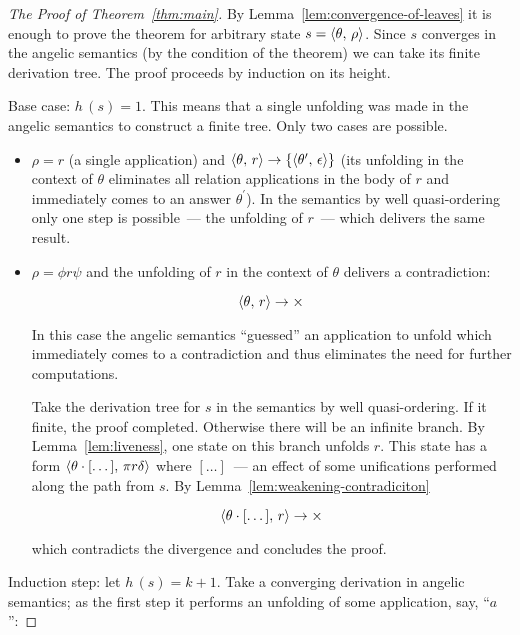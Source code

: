 \begin{proof}[The Proof of Theorem~\ref{thm:main}]
  By Lemma~\ref{lem:convergence-of-leaves} it is enough to prove the theorem for arbitrary state $s=\langle \theta,\,\rho \rangle$. Since $s$
  converges in the angelic semantics (by the condition of the theorem) we can take its finite derivation tree. The proof proceeds by induction
  on its height.

  Base case: $h\,(s)=1$. This means that a single unfolding was made in the angelic semantics to construct a finite tree. Only two cases
  are possible.

  \begin{itemize}
  \item $\rho=r$ (a single application) and $\langle \theta,\,r \rangle\to\{\langle \theta^\prime,\,\epsilon \rangle\}$ (its unfolding in the context of $\theta$
    eliminates all relation applications in the body of $r$ and immediately comes to an answer $\theta^\prime$). In the semantics by well quasi-ordering
    only one step is possible~--- the unfolding of $r$~--- which delivers the same result.
    
  \item $\rho=\phi r \psi$ and the unfolding of $r$ in the context of $\theta$ delivers a contradiction:

    \[
    \langle \theta,\,r \rangle\to\times
    \]

    In this case the angelic semantics ``guessed'' an application to unfold which immediately comes to a contradiction and thus eliminates the
    need for further computations.

    Take the derivation tree for $s$ in the semantics by well quasi-ordering. If it finite, the proof completed. Otherwise there will be an infinite branch. By
    Lemma~\ref{lem:liveness}, one state on this branch unfolds $r$. This state has a form $\langle \theta\cdot[\dots],\,\pi r \delta \rangle$ where
    $[\dots]$~--- an effect of some unifications performed along the path from $s$. By Lemma~\ref{lem:weakening-contradiciton}
    
    \[
    \langle \theta\cdot[\dots],\,r \rangle\to\times
    \]

    which contradicts the divergence and concludes the proof.
    
  \end{itemize}

  Induction step: let $h\,(s)=k+1$. Take a converging derivation in angelic semantics; as the first step it performs an unfolding of
  some application, say, ``$a$'':


\end{proof}
